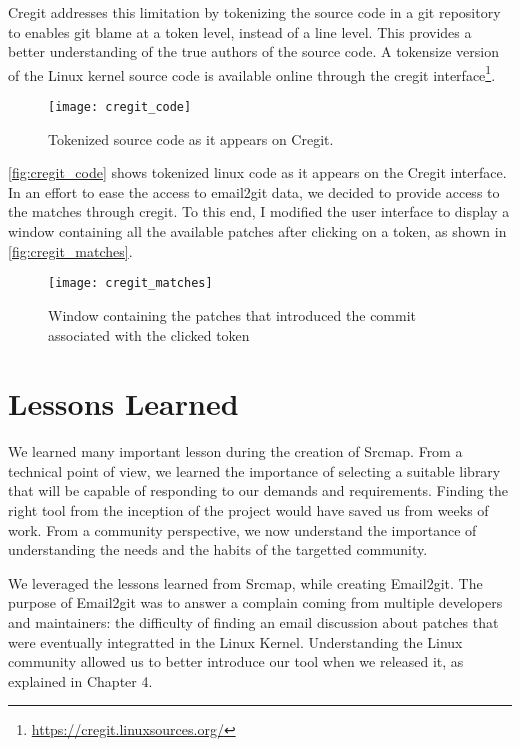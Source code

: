 Cregit addresses this limitation by tokenizing the source code in a git repository to enables git blame at a token level, instead of a line level. This provides a better understanding of the true authors of the source code. A tokensize version of the Linux kernel source code is available online through the cregit interface\footnote{\url{https://cregit.linuxsources.org/}}.

\begin{figure}[htb]
\centering
\texttt{[image: cregit\_code]}
\caption{Tokenized source code as it appears on Cregit.}
\label{fig:cregit_code}
\end{figure}

\autoref{fig:cregit_code} shows tokenized linux code as it appears on the Cregit interface. In an effort to ease the access to email2git data, we decided to provide access to the matches through cregit. To this end, I modified the user interface to display a window containing all the available patches after clicking on a token, as shown in \autoref{fig:cregit_matches}. 

\begin{figure}[htb]
\centering
\texttt{[image: cregit\_matches]}
\caption{Window containing the patches that introduced the commit associated with the clicked token}
\label{fig:cregit_matches}
\end{figure}







\section{Lessons Learned}


We learned many important lesson during the creation of Srcmap. From a technical point of view, we learned the importance of selecting a suitable library that will be capable of responding to our demands and requirements. Finding the right tool from the inception of the project would have saved us from weeks of work. From a community perspective, we now understand the importance of understanding the needs and the habits of the targetted community. 

We leveraged the lessons learned from Srcmap, while creating Email2git. The purpose of Email2git was to answer a complain coming from multiple developers and maintainers: the difficulty of finding an email discussion about patches that were eventually integratted in the Linux Kernel. Understanding the Linux community allowed us to better introduce our tool when we released it, as explained in Chapter 4.



